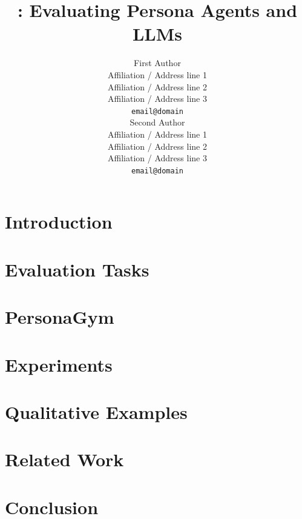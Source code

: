 \documentclass[11pt]{article}
\title{\benchmark: Evaluating Persona Agents and LLMs}
\author{First Author \\
  Affiliation / Address line 1 \\
  Affiliation / Address line 2 \\
  Affiliation / Address line 3 \\
  \texttt{email@domain} \\\And
  Second Author \\
  Affiliation / Address line 1 \\
  Affiliation / Address line 2 \\
  Affiliation / Address line 3 \\
  \texttt{email@domain} \\}
\newcommand{\benchmark}{PersonaGym\xspace}
\begin{document}
\maketitle
\begin{abstract}

\end{abstract}

%

\section{Introduction}



\section{Evaluation Tasks}
\label{sec:tasks}


\section{\benchmark}


\section{Experiments}


\section{Qualitative Examples}


\section{Related Work}


\section{Conclusion}

\end{document}
